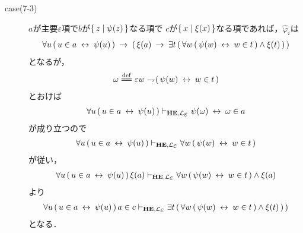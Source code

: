 \begin{metaprf}
\begin{description}
\begin{description}
					\item[case(7-3)] $a$が主要$\varepsilon$項で$b$が$\{\, z \mid \psi(z)\, \}$なる項で
						$c$が$\{\, x \mid \xi(x)\, \}$なる項であれば，$\widehat{\varphi}_{i}$は
						\begin{align}
							\forall u\, (\, u \in a \hspace{0.25em}\leftrightarrow\hspace{0.25em} \psi(u)\, ) 
							\hspace{0.25em}\rightarrow\hspace{0.25em} (\, \xi(a) 
							\hspace{0.25em}\rightarrow\hspace{0.25em} \exists t\, (\, \forall w\, (\, \psi(w) \hspace{0.25em}\leftrightarrow\hspace{0.25em} w \in t\, ) \wedge \xi(t)\, )\, )
						\end{align}
						となるが，
						\begin{align}
							\omega \defeq \varepsilon w \negation (\, \psi(w) \lrarrow w \in t\, )
						\end{align}
						とおけば
						\begin{align}
							\forall u\, (\, u \in a \lrarrow \psi(u)\, )
							\provable{\mbox{{\bf HE}},\lang{\varepsilon}} \psi(\omega) \lrarrow \omega \in a 
						\end{align}
						が成り立つので
						\begin{align}
							\forall u\, (\, u \in a \lrarrow \psi(u)\, )
							\provable{\mbox{{\bf HE}},\lang{\varepsilon}} \forall w\, (\, \psi(w) \lrarrow w \in t\, )
						\end{align}
						が従い，
						\begin{align}
							\forall u\, (\, u \in a \lrarrow \psi(u)\, )\, \xi(a)
							\provable{\mbox{{\bf HE}},\lang{\varepsilon}} \forall w\, (\, \psi(w) \lrarrow w \in t\, ) \wedge \xi(a)
						\end{align}
						より
						\begin{align}
							\forall u\, (\, u \in a \lrarrow \psi(u)\, )\, a \in c
							\provable{\mbox{{\bf HE}},\lang{\varepsilon}} \exists t\, (\, \forall w\, (\, \psi(w) \lrarrow w \in t\, ) \wedge \xi(t)\, )\, )
						\end{align}
						となる．
						

\end{description}
\end{description}
\end{metaprf}
